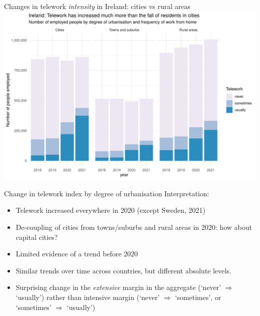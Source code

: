 \documentclass[10pt,handout]{beamer}
\begin{document}
\begin{frame}{Changes in telework \emph{intensity} in Ireland: cities vs rural areas}
\pause
\centering
\includegraphics[width=\textwidth,height=0.9\textheight,keepaspectratio]{Telework_intensity_degurba_ireland.pdf}
\end{frame}


\begin{frame}{Change in telework index by degree of urbanisation}
Interpretation:
\begin{itemize}
\item Telework increased everywhere in 2020 (except Sweden, 2021)
\item De-coupling of cities from towns/suburbs and rural areas in 2020: how about capital cities?
\item Limited evidence of a trend before 2020
\item Similar trends over time across countries, but different absolute levels.
\item Surprising change in the \emph{extensive} margin in the aggregate (`never' $\Rightarrow$ `usually') rather than intensive margin (`never' $\Rightarrow$ `sometimes', or `sometimes' $\Rightarrow$ `usually')
\end{itemize}
\end{frame}
\end{document}
